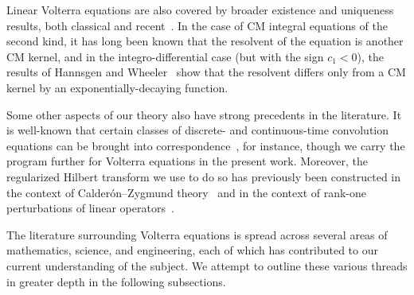 \documentclass{cams-l} %
\theoremstyle{definition}
\theoremstyle{remark}
\numberwithin{equation}{section}
\begin{document}
Linear Volterra equations are also covered by broader existence and uniqueness results, both classical and recent~\cite{Gripenberg_Londen_Staffans_1990}. In the case of CM integral equations of the second kind, it has long been known that the resolvent of the equation is another CM kernel, and in the integro-differential case (but with the sign $c_1<0$), the results of Hannsgen and Wheeler~\cite{doi:10.1137/0513067} show that the resolvent differs only from a CM kernel by an exponentially-decaying function. 

Some other aspects of our theory also have strong precedents in the literature. It is well-known that certain classes of discrete- and continuous-time convolution equations can be brought into correspondence~\cite{Nikolski_2020}, for instance, though we carry the program further for Volterra equations in the present work. Moreover, the regularized Hilbert transform we use to do so has previously been constructed in the context of Calder\'on--Zygmund theory~\cite{10.1007/BF02392130} and in the context of rank-one perturbations of linear operators~\cite{Albeverio2004}.

The literature surrounding Volterra equations is spread across several areas of mathematics, science, and engineering, each of which has contributed to our current understanding of the subject. We attempt to outline these various threads in greater depth in the following subsections.
\end{document}
